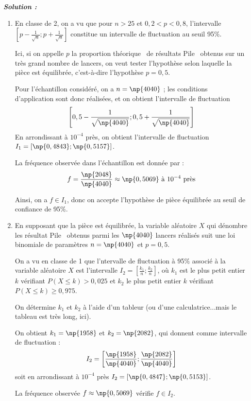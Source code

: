 \begin{spacing}{1.2}
\newpage

\textbf{\textit{Solution :}}

\begin{enumerate}
\item En classe de 2, on a vu que pour $n>25$ et $0,2<p<0,8$, l'intervalle $\left[p-\frac{1}{\sqrt{n}};p+\frac{1}{\sqrt{n}}\right]$ constitue un intervalle de fluctuation au seuil 95\%.

Ici, si on appelle $p$ la \og proportion théorique\fg~ de résultats \og Pile\fg~ obtenus sur un très grand nombre de lancers, on veut tester l'hypothèse selon laquelle la pièce est équilibrée, c'est-à-dire l'hypothèse $p=0,5$.

Pour l'échantillon considéré, on a $n=\np{4040}$ ; les conditions d'application sont donc réalisées, et on obtient l'intervalle de fluctuation 
\[\left[0,5-\frac{1}{\sqrt{\np{4040}}};0,5+\frac{1}{\sqrt{\np{4040}}}\right]\]
En arrondissant à $10^{-4}$ près, on obtient l'intervalle de fluctuation $I_1=[\np{0,4843};\np{0,5157}]$.

La fréquence observée dans l'échantillon est donnée par :
\[f=\frac{\np{2048}}{\np{4040}}\approx \np{0,5069}~\text{à}~10^{-4}~\text{près}\]

Ainsi, on a $f\in I_1$, donc on accepte l'hypothèse de pièce équilibrée au seuil de confiance de 95\%.

\item En supposant que la pièce est équilibrée, la variable aléatoire $X$ qui dénombre les résultat \og Pile\fg~ obtenus parmi les $\np{4040}$ lancers réalisés suit une loi binomiale de paramètres $n=\np{4040}$ et $p=0,5$.

On a vu en classe de 1 que l'ntervalle de fluctuation à 95\% associé à la variable aléatoire $X$ est l'intervalle $I_2=\left[\frac{k_1}{n};\frac{k_2}{n}\right]$, où $k_1$ est le plus petit entier $k$ vérifiant $P(X\leq k)> 0,025$ et $k_2$ le plus petit entier $k$ vérifiant $P(X\leq k)\geq 0,975$.

On détermine $k_1$ et $k_2$ à l'aide d'un tableur (ou d'une calculatrice...mais le tableau est très long, ici).

On obtient $k_1=\np{1958}$ et $k_2=\np{2082}$, qui donnent comme intervalle de fluctuation :
\[I_2=\left[\frac{\np{1958}}{\np{4040}};\frac{\np{2082}}{\np{4040}}\right]\]
soit en arrondissant à $10^{-4}$ près $I_2=[\np{0,4847};\np{0,5153}]$.

La fréquence observée $f\approx \np{0,5069}$ vérifie $f\in I_2$.


\end{enumerate}
\end{spacing}
